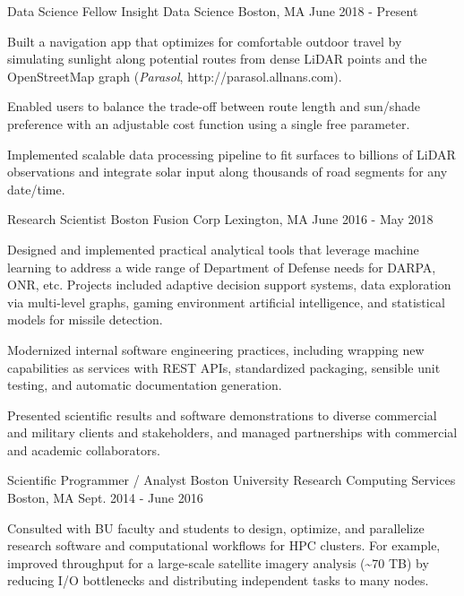 \documentclass[11pt, letter]{awesome-cv}
\begin{document}
\begin{cventries}
  \cventry
    {Data Science Fellow}
    {Insight Data Science}
    {Boston, MA}
    {June 2018 - Present}
    {
    \begin{cvitems}
      \item Built a navigation app that optimizes for comfortable outdoor travel by simulating sunlight along potential routes from dense LiDAR points and the OpenStreetMap graph (\emph{Parasol}, http://parasol.allnans.com).
      \item Enabled users to balance the trade-off between route length and sun/shade preference with an adjustable cost function using a single free parameter. 
      \item Implemented scalable data processing pipeline to fit surfaces to billions of LiDAR observations and integrate solar input along thousands of road segments for any date/time.
    \end{cvitems}
    }
  \cventry
    {Research Scientist}
    {Boston Fusion Corp}
    {Lexington, MA}
    {June 2016 - May 2018}
    {
      \begin{cvitems}
        \item {Designed and implemented practical analytical tools that leverage machine learning to address a wide range of Department of Defense needs for DARPA, ONR, etc. Projects included adaptive decision support systems, data exploration via multi-level graphs, gaming environment artificial intelligence, and statistical models for missile detection.}
        \item {Modernized internal software engineering practices, including wrapping new capabilities as services with REST APIs, standardized packaging, sensible unit testing, and automatic documentation generation.}
        \item {Presented scientific results and software demonstrations to diverse commercial and military clients and stakeholders, and managed partnerships with commercial and academic collaborators.}
      \end{cvitems}
    }
  \cventry
    {Scientific Programmer / Analyst}
    {Boston University Research Computing Services}
    {Boston, MA}
    {Sept. 2014 - June 2016}
    {
      \begin{cvitems}
        \item {Consulted with BU faculty and students to design, optimize, and parallelize research software and computational workflows for HPC clusters. For example, improved throughput for a large-scale satellite imagery analysis (\textasciitilde70 TB) by reducing I/O bottlenecks and distributing independent tasks to many nodes.}

\end{cvitems}}
\end{cventries}
\end{document}
